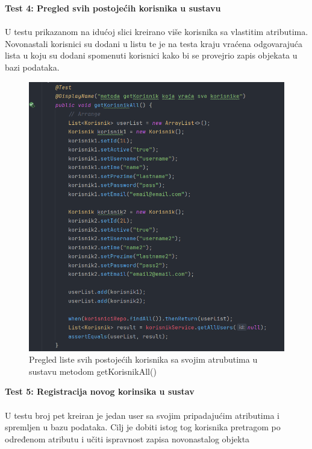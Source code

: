 		\pagebreak 
		
		\textbf{Test 4: Pregled svih postojećih korisnika u sustavu}\\
			\\ U testu prikazanom na idućoj slici kreirano više korisnika sa vlastitim atributima. Novonastali korisnici su dodani u listu te je na testa kraju vraćena odgovarajuća lista u koju su dodani spomenuti korisnici kako bi se provejrio zapis objekata u bazi podataka.
			
			\begin{figure}[H]
			\includegraphics[scale=0.6]{slike/allUsers.PNG} %
			\centering
			\caption{Pregled liste svih postojećih korisnika sa svojim atrubutima u sustavu metodom getKorisnikAll()}
			\label{fig:implementacija}
		\end{figure}
		
		\textbf{Test 5: Registracija novog korinsika u sustav}\\
			\\ U testu broj pet kreiran je jedan user sa svojim pripadajućim atributima i spremljen u bazu podataka. Cilj je dobiti istog tog korisnika pretragom po određenom atributu i učiti ispravnost zapisa novonastalog objekta
			
